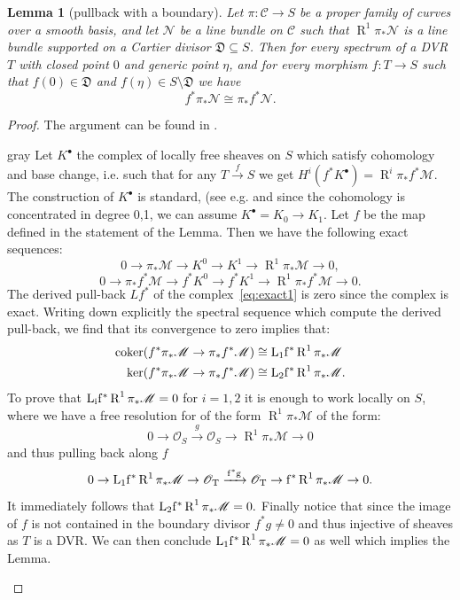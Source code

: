 \documentclass[11pt]{amsart}
\newcommand{\OO}{\mathcal O}
\renewcommand{\to}{\rightarrow}
\newcommand{\cC}{\mathcal C}
\newcommand{\R}{\operatorname{R}}
\theoremstyle{plain}
\newtheorem{lem}[thm]{Lemma}
\theoremstyle{definition}
\begin{document}
\begin{lem}[pullback with a boundary]\label{DVR}
Let $\pi\colon\cC\to S$ be a proper family of curves over a smooth basis, and let $\mathcal N$ be a line bundle on $\cC$ such that $\R^1\pi_*\mathcal N$ is a line bundle supported on a Cartier divisor $\mathfrak D\subseteq S$. Then for every spectrum of a DVR $T$ with closed point $0$ and generic point $\eta$, and for every morphism $f\colon T\to S$ such that $f(0)\in\mathfrak D$ and $f(\eta)\in S\setminus\mathfrak D$ we have
\[f^*\pi_*\mathcal N\cong \pi_*f^*\mathcal N.\]
\end{lem}
\begin{proof}
The argument can be found in \cite[Lemmma~3.7.2.2]{RSPW}.
\begin{color}{gray}{
Let $K^{\bullet}$ the complex of locally free sheaves on $S$ which satisfy cohomology and base change, i.e. such that for any $T\xrightarrow{f} S$  we get
$H^i(f^*K^{\bullet})=\R^i\pi_*f^*\mathcal M.$ The construction of $K^{\bullet}$ is standard, (see e.g. \cite[Proposition~12.2]{HAR} and since the cohomology is concentrated in degree 0,1, we can assume $K^{\bullet}=K_0\to K_1.$ Let $f$ be the map defined in the statement of the Lemma.
Then we have the following exact sequences:
\begin{equation}\label{eq:exact1}
0\to \pi_*\mathcal M\to K^0\to K^1\to \R^1\pi_*\mathcal M\to 0,
\end{equation}
\begin{equation}\label{eq:exact2}
0\to \pi_*f^*\mathcal M\to f^*K^0\to f^*K^1\to \R^1\pi_*f^*\mathcal M\to 0.
\end{equation}
The derived pull-back $Lf^*$ of the complex~\eqref{eq:exact1} is zero since the complex is exact. Writing down explicitly the spectral sequence which compute the derived pull-back, we find that its convergence to zero implies that:
\begin{align*}
\operatorname{coker}(f^*\pi_*\mathcal M\to\pi_*f^*\mathcal M)&\cong \rm{L}_1f^*\R^1\pi_*\mathcal M\\
\operatorname{ker}(f^*\pi_*\mathcal M\to\pi_*f^*\mathcal M)&\cong \rm{L}_2f^*\R^1\pi_*\mathcal M.
\end{align*} 
To prove that $\rm{L}_if^*\R^1\pi_*\mathcal M=0$ for $i=1,2$ it is enough to work locally on $S$, where we have a free resolution for  of the form $\R^1\pi_*\mathcal M$ of the form:
\[0\rightarrow \OO_S\xrightarrow{g}\OO_S\rightarrow \R^1\pi_*\mathcal M\rightarrow 0\] 
and thus pulling back along $f$
\[0\rightarrow  \rm{L}_1f^*\R^1\pi_*\mathcal M \to \OO_T\xrightarrow{f^*g}\OO_T\rightarrow f^*\R^1\pi_*\mathcal M\rightarrow 0.\] 
It immediately follows that $ \rm{L}_2f^*\R^1\pi_*\mathcal M=0.$ Finally notice that since the image of $f$ is not contained in the boundary divisor $f^*g\neq 0$ and thus injective of sheaves as $T$ is a DVR. We can then conclude $ \rm{L}_1f^*\R^1\pi_*\mathcal M=0$ as well which implies the Lemma.}\end{color}
\end{proof}
\end{document}
